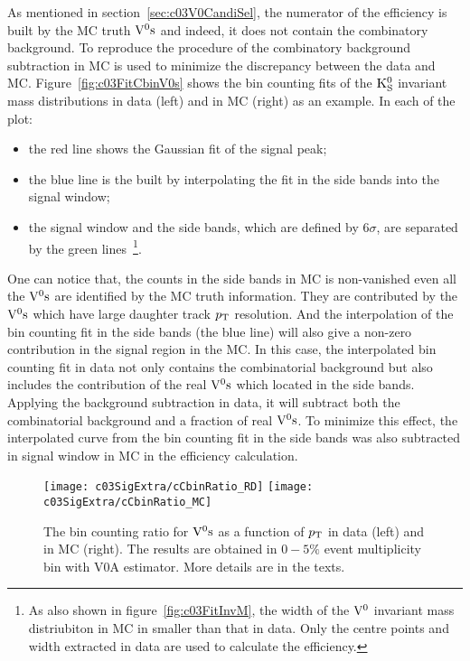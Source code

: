 As mentioned in section~\ref{sec:c03V0CandiSel},
the numerator of the efficiency is built by the MC truth ${\rm V}^{0}{\rm s}$
and indeed, it does not contain the combinatory background.
To reproduce the procedure of the combinatory background subtraction
in MC is used to minimize the discrepancy between the data and MC.
Figure~\ref{fig:c03FitCbinV0s} shows the bin counting fits of the ${\rm K}_{\rm S}^{0}$
invariant mass distributions in data (left) and in MC (right) as an example.
In each of the plot:
\begin{itemize}
\item the red line shows the Gaussian fit of the signal peak;
\item the blue line is the built by interpolating the fit in the side bands
      into the signal window;
\item the signal window and the side bands,
      which are defined by $6\sigma$,
      are separated by the green lines~\footnote{As also shown in
      figure~\ref{fig:c03FitInvM}, the width of the ${\rm V}^{0}$ invariant mass
      distriubiton in MC in smaller than that in data.
      Only the centre points and width extracted in data are used to
      calculate the efficiency.}.
\end{itemize}
One can notice that,
the counts in the side bands in MC is non-vanished even all the ${\rm V}^{0}{\rm s}$ are
identified by the MC truth information.
They are contributed by the ${\rm V}^{0}{\rm s}$ which have large daughter track $p_{\rm T}$
resolution.
And the interpolation of the bin counting fit in the side bands (the blue line)
will also give a non-zero contribution in the signal region in the MC.
In this case, the interpolated bin counting fit in data not only contains the
combinatorial background but also includes the contribution of the
real ${\rm V}^{0}{\rm s}$ which located in the side bands.
Applying the background subtraction in data,
it will subtract both the combinatorial background and a fraction of
real ${\rm V}^{0}{\rm s}$.
To minimize this effect, the interpolated curve from the bin counting fit
in the side bands was also subtracted in signal window in MC in the
efficiency calculation.

\begin{figure}[htb]
\begin{center}
\texttt{[image: c03SigExtra/cCbinRatio\_RD]}
\texttt{[image: c03SigExtra/cCbinRatio\_MC]}
\caption{The bin counting ratio for ${\rm V}^{0}{\rm s}$ as a function of $p_{\rm T}$ in data (left) and in MC (right).
The results are obtained in $0-5\%$ event multiplicity bin with V0A estimator.
More details are in the texts.}
\label{fig:c03CbinRatio}
\end{center}
\end{figure}

